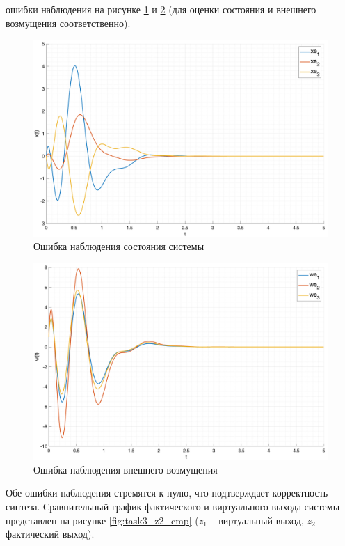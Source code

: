 ошибки наблюдения на рисунке \ref{fig:task3_z2_xerr_cmp} и \ref{fig:task3_z2_werr_cmp} (для оценки состояния и внешнего возмущения соответственно).
\begin{figure}[ht!]
    \centering
    \includegraphics[width=\textwidth]{media/plots/task3_z2_xerr_cmp.png}
    \caption{Ошибка наблюдения состояния системы}
    \label{fig:task3_z2_xerr_cmp}
\end{figure}
\begin{figure}[ht!]
    \centering
    \includegraphics[width=\textwidth]{media/plots/task3_z2_werr_cmp.png}
    \caption{Ошибка наблюдения внешнего возмущения}
    \label{fig:task3_z2_werr_cmp}
\end{figure}
Обе ошибки наблюдения стремятся к нулю, что подтверждает корректность синтеза.
Сравнительный график фактического и виртуального выхода системы представлен на рисунке \ref{fig:task3_z2_cmp} ($z_1$ -- виртуальный выход, $z_2$ -- фактический выход).
